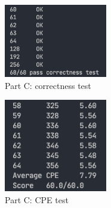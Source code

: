 \documentclass[12pt,a4paper]{article}
\begin{document}
\begin{figure}[H] %
        \centering %
        \includegraphics[width=0.4\textwidth]{partC-correctness-test.png} %
        \caption{Part C: correctness test} %
        \label{Fig.partC-correctness} %
\end{figure}
\begin{figure}[H] %
        \centering %
        \includegraphics[width=0.4\textwidth]{partC-CPE-test.png} %
        \caption{Part C: CPE test} %
        \label{Fig.partC-CPE} %
\end{figure}
\pagebreak
\end{document}
